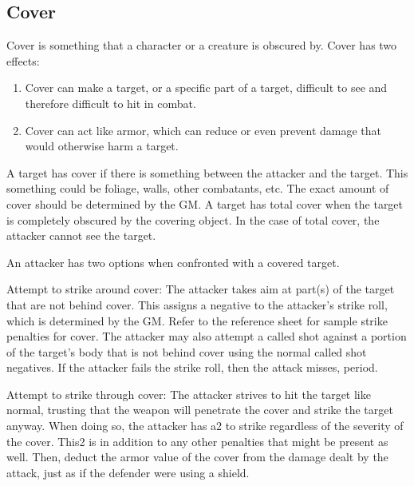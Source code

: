 \documentclass[twoside]{book}
\begin{document}
  
    

\subsection{Cover}
    
    {  
    Cover is something that a character or a creature is obscured by. Cover has two effects:
    }
  
\begin{enumerate}
      
  \item 
    {  
    Cover can make a target, or a specific part of a target, difficult to see and therefore difficult to hit in combat.
    }
  
  \item 
    {  
    Cover can act like armor, which can reduce or even prevent damage that would otherwise harm a target.
    }
  
\end{enumerate}
  
    {  
    A target has cover if there is something between the attacker and the target. This something could be foliage, walls, other combatants, etc. The exact amount of cover should be determined by the GM. A target has total cover when the target is completely obscured by the covering object. In the case of total cover, the attacker cannot see the target.
    }
  
    {  
    An attacker has two options when confronted with a covered target.
    }
  
    {  
    Attempt to strike around cover: The attacker takes aim at part(s) of the target that are not behind cover. This assigns a negative to the attacker's strike roll, which is determined by the GM. Refer to the reference sheet for sample strike penalties for cover. The attacker may also attempt a called shot against a portion of the target's body that is not behind cover using the normal called shot negatives. If the attacker fails the strike roll, then the attack misses, period.
    }
  
    {  
    Attempt to strike through cover: The attacker strives to hit the target like normal, trusting that the weapon will penetrate the cover and strike the target anyway. When doing so, the attacker has a2 to strike regardless of the severity of the cover. This2 is in addition to any other penalties that might be present as well. Then, deduct the armor value of the cover from the damage dealt by the attack, just as if the defender were using a shield.
    }
  
\end{document}
